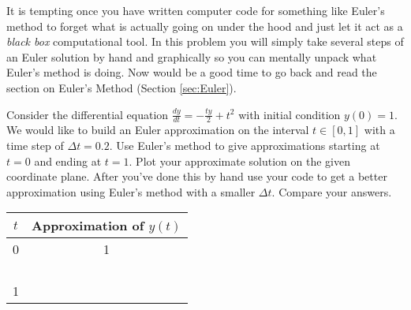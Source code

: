 \begin{problem}
    It is tempting once you have written computer code for something like Euler's method
    to forget what is actually going on under the hood and just let it act as a {\it black
    box} computational tool.  In this problem you will simply
    take several steps of an Euler solution by hand and graphically so you can mentally
    unpack what Euler's method is doing. Now would be a good time to go back and read the
    section on Euler's Method (Section \ref{sec:Euler}).

    Consider the differential equation $\frac{dy}{dt} = -\frac{ty}{2} + t^2$ with
    initial condition $y(0) = 1$.  We would like to build an Euler approximation on the
    interval $t \in [0,1]$ with a time step of $\Delta t = 0.2$. Use Euler's method to
    give approximations starting at $t=0$ and ending at $t=1$.  Plot your approximate
    solution on the given coordinate plane.  After you've done this by hand use your code
    to get a better approximation using Euler's method with a smaller $\Delta t$.  Compare
    your answers.

    \begin{center}
        \begin{tabular}{|c|c|}
            \hline
            $t$ & Approximation of $y(t)$ \\ \hline \hline
            0 & 1 \\ \hline
            & \\ \hline
            & \\ \hline
            & \\ \hline
            & \\ \hline
            1 & \\ \hline
        \end{tabular}
    \end{center}
    \begin{center}
    \end{center}
\end{problem}

